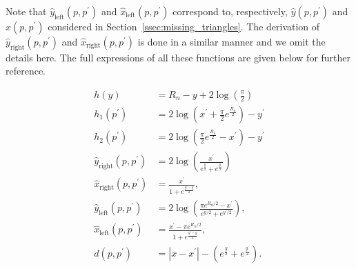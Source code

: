 Note that $\hat{y}_{\text{left}}(p,p^\prime)$ and $\hat{x}_{\text{left}}(p,p^\prime)$ correspond to, respectively, $\hat{y}(p,p^\prime)$ and $\hat{x}(p,p^\prime)$ considered in Section~\ref{ssec:missing_triangles}. The derivation of $\hat{y}_{\text{right}}(p,p^\prime)$ and $\hat{x}_{\text{right}}(p,p^\prime)$ is done in a similar manner and we omit the details here. The full expressions of all these functions are given below for further reference.

\begin{align}
	h(y) &= R_n - y + 2\log\left(\frac{\pi}{2}\right) \label{eq:def_height_y_P_n}\\
	h_1(p^\prime) &= 2\log\left(x^\prime + \frac{\pi}{2}e^{\frac{R_n}{2}}\right) - y^\prime \label{eq:def_height_left_P_n} \\
	h_2(p^\prime) &= 2\log\left(\frac{\pi}{2}e^{\frac{R_n}{2}} - x^\prime\right) - y^\prime 
		\label{eq:def_height_right_P_n} \\
	\hat{y}_{\text{right}}(p,p^\prime) &= 2\log\left(\frac{x^\prime}{e^{\frac{y}{2}} + e^{\frac{y^\prime}{2}}}\right)\\
	\hat{x}_{\text{right}}(p,p^\prime) &= \frac{x^\prime}{1 + 	
		e^{\frac{y^\prime - y}{2}}},\\
	\hat{y}_{\text{left}}(p,p^\prime) &= 2 \log\left(\frac{\pi e^{R_n/2} - x^\prime}{e^{y/2} + e^{y^\prime/2}}\right),\\
	\hat{x}_{\text{left}}(p,p^\prime) &= \frac{x^\prime - \pi e^{R_n/2}}{1 + e^{\frac{y^\prime - y}{2}}}, \\
	d(p,p^\prime) &= |x - x^\prime| - \left(e^{\frac{y}{2}} + e^{\frac{y^\prime}{2}}\right).
	\label{eq:def_d_p_p_prime}
\end{align}

